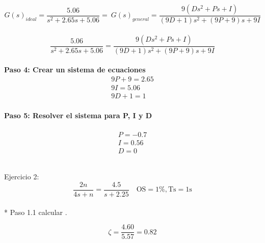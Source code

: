 \documentclass[12pt,letterpaper]{article}
\begin{document}
\begin{equation}G(s)_{ideal}=\frac{5.06}{s^{2}+2.65s+5.06} = \  G(s)_{general} =  \frac{9(Ds^{2}+Ps+I)}{(9D+1)s^{2}+(9P+9)s+9I} \end{equation} \\ 

\begin{equation}\frac{5.06}{s^{2}+2.65s+5.06} =  \frac{9(Ds^{2}+Ps+I)}{(9D+1)s^{2}+(9P+9)s+9I} \end{equation} \\ 


\textbf{Paso 4: Crear un sistema de ecuaciones } \\ 


\begin{equation}\begin{array}{l}
9P+9=2.65 \\
9I=5.06\\
9D+1=1 
\end{array}\end{equation} \\ 



\textbf{Paso 5: Resolver el sistema para P, I y D } \\ \\

\begin{equation}\begin{array}{l}
P=-0.7\\
I=0.56\\
D=0
\end{array}\end{equation} \\ 
 
 
 

\setcounter{equation}{0} %

Ejercicio 2: \\ 


\begin{equation}\frac{2n}{4s+n} = \frac{4.5}{s+2.25} \quad \mathrm{OS}=1 \%, \mathrm{Ts}=1 \mathrm{s}\end{equation} \\ 

* Paso 1.1 calcular \zeta.

\begin{equation}\zeta=\frac{4.60}{5.57}=0.82\end{equation} \\ 
\end{document}
